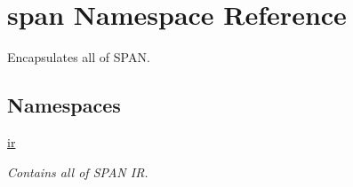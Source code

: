 \hypertarget{namespacespan}{}\section{span Namespace Reference}
\label{namespacespan}


Encapsulates all of S\+P\+AN.  


\subsection*{Namespaces}
\begin{DoxyCompactItemize}
\item 
 \hyperlink{namespacespan_1_1ir}{ir}
\begin{DoxyCompactList}\small\item\em Contains all of S\+P\+AN IR. \end{DoxyCompactList}\end{DoxyCompactItemize}
